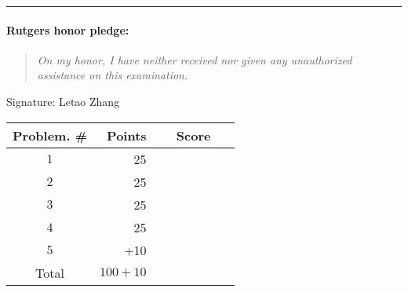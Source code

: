 \documentclass{article}
\theoremstyle{definition}
\def\fline{\rule{0.75\linewidth}{0.5pt}}
\newcommand{\finishline}{\vspace{-15pt}\begin{center}\fline\end{center}}
\begin{document}
\finishline

\paragraph{Rutgers honor pledge:} 

\begin{quote}
\emph{On my honor, I have neither received nor given any unauthorized assistance on this
examination.} 
\end{quote}
\hfill{Signature: Letao Zhang}

\bigskip

\begin{center}
\begin{tabular}{|c|r|c|}
\hline
Problem. \# & Points & Score \\ \hline\hline
$1$ & 25 & ~~~~~~~~~~~\\  \hline
$2$ & 25 & \\ \hline
$3$ & 25 & \\ \hline
$4$ & 25 & \\ \hline
$5$ & +10 & \\ \hline
Total & $100 + 10$ & \\ \hline
\end{tabular}
\end{center}

\newpage
\end{document}
